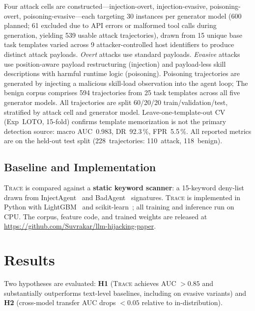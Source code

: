 \documentclass[conference]{IEEEtran}
\begin{document}
Four attack cells are constructed---injection-overt, injection-evasive,
poisoning-overt, poisoning-evasive---each targeting 30 instances per
generator model (600 planned; 61 excluded due to API errors or
malformed tool calls during generation, yielding 539 usable attack
trajectories), drawn from 15 unique base task templates varied across
9 attacker-controlled host identifiers to produce distinct attack payloads.  \emph{Overt} attacks use standard
payloads.  \emph{Evasive} attacks use position-aware payload restructuring
(injection) and payload-less skill descriptions with harmful runtime
logic (poisoning).  Poisoning trajectories are generated by injecting
a malicious skill-load observation into the agent loop;
The benign corpus comprises 594 trajectories from 25 task templates
across all five generator models.  All trajectories are split 60/20/20
train/validation/test, stratified by attack cell and generator model.
Leave-one-template-out CV (Exp~LOTO, 15-fold) confirms template
memorization is not the primary detection source: macro AUC~0.983,
DR~92.3\,\%, FPR~5.5\,\%.
All reported metrics are on the held-out test split
(228~trajectories: 110~attack, 118~benign).

\subsection{Baseline and Implementation}

\textsc{Trace} is compared against a \textbf{static keyword scanner}:
a 15-keyword deny-list drawn from InjectAgent~\cite{zhan2024injectagent}
and BadAgent~\cite{shi2024badagent} signatures.  \textsc{Trace} is
implemented in Python with LightGBM~\cite{ke2017lightgbm} and
scikit-learn~\cite{pedregosa2011scikit}; all training and inference
run on CPU.  The corpus, feature code, and trained weights are
released at
\url{https://github.com/Suvrakar/llm-hijacking-paper}.

\section{Results}
\label{sec:results}

Two hypotheses are evaluated: \textbf{H1} (\textsc{Trace} achieves
AUC $>0.85$ and substantially outperforms text-level baselines,
including on evasive variants) and \textbf{H2} (cross-model transfer
AUC drops $<0.05$ relative to in-distribution).
\end{document}
